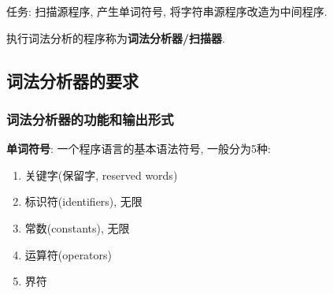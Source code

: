     任务: 扫描源程序, 产生单词符号, 将字符串源程序改造为中间程序.

    执行词法分析的程序称为\textbf{词法分析器/扫描器}.

    \subsection{词法分析器的要求}

        \subsubsection{词法分析器的功能和输出形式}

            \textbf{单词符号}: 一个程序语言的基本语法符号, 一般分为5种:

            \begin{enumerate}
                \item 关键字(保留字, reserved words)
                \item 标识符(identifiers), 无限
                \item 常数(constants), 无限
                \item 运算符(operators)
                \item 界符
            \end{enumerate}
\fi
